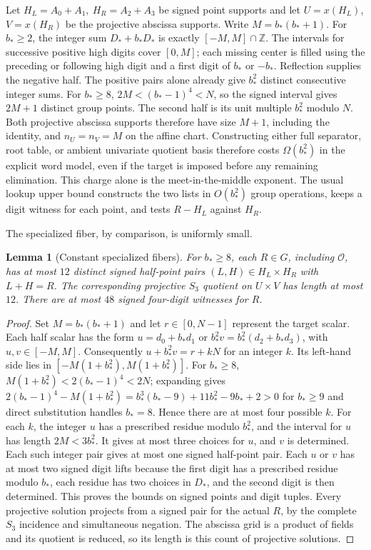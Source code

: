 \documentclass[11pt]{article}
\newtheorem{lemma}[theorem]{Lemma}
\newcommand{\OO}{\mathcal O}
\begin{document}
Let \(H_L=A_0+A_1,\ H_R=A_2+A_3\) be signed point supports and let \(U=x(H_L)\), \(V=x(H_R)\) be the projective abscissa supports. Write \(M=b_*(b_*+1)\). For \(b_*\ge2\), the integer sum \(D_*+b_*D_*\) is exactly \([-M,M]\cap\mathbb Z\). The intervals for successive positive high digits cover \([0,M]\); each missing center is filled using the preceding or following high digit and a first digit of \(b_*\) or \(-b_*\). Reflection supplies the negative half. The positive pairs alone already give \(b_*^2\) distinct consecutive integer sums. For \(b_*\ge8\), \(2M<(b_*-1)^4<N\), so the signed interval gives \(2M+1\) distinct group points. The second half is its unit multiple \(b_*^2\) modulo \(N\). Both projective abscissa supports therefore have size \(M+1\), including the identity, and \(n_U=n_V=M\) on the affine chart. Constructing either full separator, root table, or ambient univariate quotient basis therefore costs \(\Omega(b_*^2)\) in the explicit word model, even if the target is imposed before any remaining elimination. This charge alone is the meet-in-the-middle exponent. The usual lookup upper bound constructs the two lists in \(O(b_*^2)\) group operations, keeps a digit witness for each point, and tests \(R-H_L\) against \(H_R\).

The specialized fiber, by comparison, is uniformly small.
\begin{lemma}[Constant specialized fibers]
For \(b_*\ge8\), each \(R\in G\), including \(\OO\), has at most \(12\) distinct signed half-point pairs \((L,H)\in H_L\times H_R\) with \(L+H=R\). The corresponding projective \(S_3\) quotient on \(U\times V\) has length at most \(12\). There are at most \(48\) signed four-digit witnesses for \(R\).
\end{lemma}
\begin{proof}
Set \(M=b_*(b_*+1)\) and let \(r\in[0,N-1]\) represent the target scalar. Each half scalar has the form \(u=d_0+b_*d_1\) or \(b_*^2 v=b_*^2(d_2+b_*d_3)\), with \(u,v\in[-M,M]\). Consequently \(u+b_*^2v=r+kN\) for an integer \(k\). Its left-hand side lies in \([-M(1+b_*^2),M(1+b_*^2)]\). For \(b_*\ge8\), \(M(1+b_*^2)<2(b_*-1)^4<2N\); expanding gives \(2(b_*-1)^4-M(1+b_*^2)=b_*^3(b_*-9)+11b_*^2-9b_*+2>0\) for \(b_*\ge9\) and direct substitution handles \(b_*=8\). Hence there are at most four possible \(k\). For each \(k\), the integer \(u\) has a prescribed residue modulo \(b_*^2\), and the interval for \(u\) has length \(2M<3b_*^2\). It gives at most three choices for \(u\), and \(v\) is determined. Each such integer pair gives at most one signed half-point pair. Each \(u\) or \(v\) has at most two signed digit lifts because the first digit has a prescribed residue modulo \(b_*\), each residue has two choices in \(D_*\), and the second digit is then determined. This proves the bounds on signed points and digit tuples. Every projective solution projects from a signed pair for the actual \(R\), by the complete \(S_3\) incidence and simultaneous negation. The abscissa grid is a product of fields and its quotient is reduced, so its length is this count of projective solutions.
\end{proof}
\end{document}
